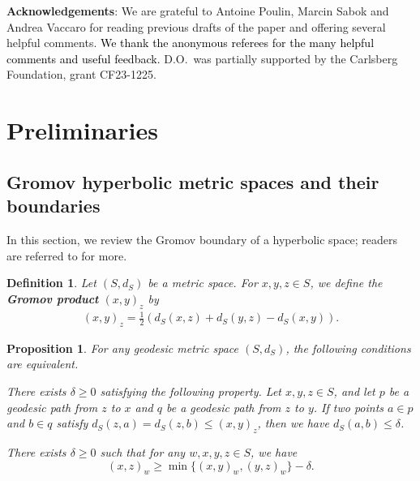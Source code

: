 \documentclass{article}[11pt]
\newtheorem{defn}[thm]{Definition}
\newtheorem{prop}[thm]{Proposition}
\begin{document}
{%

\textbf{Acknowledgements}: We are grateful to Antoine Poulin, Marcin Sabok and Andrea Vaccaro for reading previous drafts of the paper and offering several helpful comments. \textcolor{black}{We thank the anonymous referees for the many helpful comments and useful feedback.} D.O.\ was partially supported by the Carlsberg Foundation, grant CF23-1225.

\section{Preliminaries}

\subsection{Gromov hyperbolic metric spaces and their boundaries}

In this section, we review the Gromov boundary of a hyperbolic space; readers are referred to \cite{BH99} for more.

\begin{defn}\label{def:Gromov product}
    Let $(S,d_S)$ be a metric space. For $x,y,z\in S$, we define the \textbf{Gromov product} $(x,y)_z$ by
\begin{align}\label{eq:gromov product}
    (x,y)_z=\frac{1}{2}\left( d_S(x,z)+d_S(y,z)-d_S(x,y) \right).    
\end{align}
\end{defn}

\begin{prop} \label{prop:hyp sp}
    For any geodesic metric space $(S,d_S)$, the following conditions are equivalent.
    \item[(1)]
    There exists $\delta \geq 0$ satisfying the following property. Let $x,y,z\in S$, and let $p$ be a geodesic path from $z$ to $x$ and $q$ be a geodesic path from $z$ to $y$. If two points $a\in p$ and $b\in q$ satisfy $d_S(z,a)=d_S(z,b)\le (x,y)_z$, then we have $d_S(a,b) \le \delta$.
    \item[(2)] 
    There exists $\delta \geq 0$ such that for any $w,x,y,z \in S$, we have
    \[
    (x,z)_w \ge \min\{(x,y)_w,(y,z)_w\} - \delta.
    \]
\end{prop}

}
\end{document}
